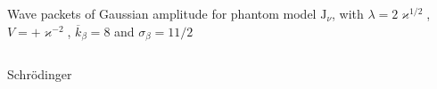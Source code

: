\documentclass[8pt]{beamer}
\begin{document}
\begin{frame}%
{Wave packets of Gaussian amplitude for phantom model}%
{$\mathrm{J}_{\nu}$, with $\lambda = 2\varkappa^{1/2}$,
$V = +\varkappa^{-2}$, $\overline{k}_\beta = 8$ and $\sigma_\beta = 11/2$}
\begin{columns}
\begin{column}{.49\textwidth}
\begin{block}{Schrödinger}

\end{block}
\end{column}
\end{columns}
\end{frame}
\end{document}

